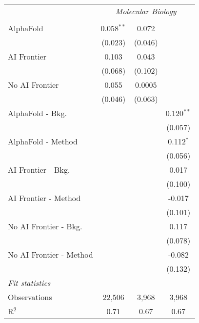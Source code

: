 \begin{tabular}{lccc}
 & \multicolumn{3}{c}{\textit{Molecular Biology}} \\ \\
   AlphaFold               & 0.058$^{**}$ & 0.072   &   \\   
                           & (0.023)      & (0.046) &   \\   
   AI Frontier             & 0.103        & 0.043   &   \\   
                           & (0.068)      & (0.102) &   \\   
   No AI Frontier          & 0.055        & 0.0005  &   \\   
                           & (0.046)      & (0.063) &   \\   
   AlphaFold - Bkg.        &              &         & 0.120$^{**}$\\   
                           &              &         & (0.057)\\   
   AlphaFold - Method      &              &         & 0.112$^{*}$\\   
                           &              &         & (0.056)\\   
   AI Frontier - Bkg.      &              &         & 0.017\\   
                           &              &         & (0.100)\\   
   AI Frontier - Method    &              &         & -0.017\\   
                           &              &         & (0.101)\\   
   No AI Frontier - Bkg.   &              &         & 0.117\\   
                           &              &         & (0.078)\\   
   No AI Frontier - Method &              &         & -0.082\\   
                           &              &         & (0.132)\\   
   \midrule
   \emph{Fit statistics}\\
   Observations            & 22,506       & 3,968   & 3,968\\  
   R$^2$                   & 0.71         & 0.67    & 0.67\\  
   

\end{tabular}
